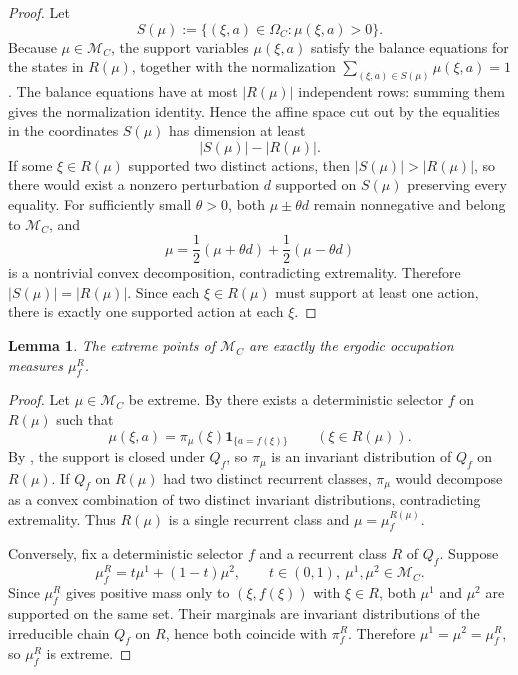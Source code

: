 \documentclass[12pt]{article}
\newtheorem{lemma}[theorem]{Lemma}
\theoremstyle{definition}
\newcommand{\1}{\mathbf{1}}
\newcommand{\cM}{\mathcal{M}}
\begin{document}
\begin{proof}
Let
\[
S(\mu):=\{(\xi,a)\in \Omega_C:\mu(\xi,a)>0\}.
\]
Because \(\mu\in \cM_C\), the support variables \(\mu(\xi,a)\) satisfy the balance
equations for the states in \(R(\mu)\), together with the normalization
\(\sum_{(\xi,a)\in S(\mu)}\mu(\xi,a)=1\).  The balance equations have at most \(|R(\mu)|\)
independent rows: summing them gives the normalization identity.  Hence the affine space
cut out by the equalities in the coordinates \(S(\mu)\) has dimension at least
\[
|S(\mu)|-|R(\mu)|.
\]
If some \(\xi\in R(\mu)\) supported two distinct actions, then \(|S(\mu)|>|R(\mu)|\), so
there would exist a nonzero perturbation \(d\) supported on \(S(\mu)\) preserving every
equality.  For sufficiently small \(\theta>0\), both \(\mu\pm \theta d\) remain
nonnegative and belong to \(\cM_C\), and
\[
\mu=\frac12(\mu+\theta d)+\frac12(\mu-\theta d)
\]
is a nontrivial convex decomposition, contradicting extremality.  Therefore
\(|S(\mu)|=|R(\mu)|\).  Since each \(\xi\in R(\mu)\) must support at least one action,
there is exactly one supported action at each \(\xi\).
\end{proof}

\begin{lemma}
\label{lem:extreme-ergodic2}
The extreme points of \(\cM_C\) are exactly the ergodic occupation measures \(\mu_f^R\).
\end{lemma}

\begin{proof}
Let \(\mu\in \cM_C\) be extreme.  By  there exists a
deterministic selector \(f\) on \(R(\mu)\) such that
\[
\mu(\xi,a)=\pi_\mu(\xi)\1_{\{a=f(\xi)\}}
\qquad (\xi\in R(\mu)).
\]
By , the support is closed under \(Q_f\), so \(\pi_\mu\) is an
invariant distribution of \(Q_f\) on \(R(\mu)\).  If \(Q_f\) on \(R(\mu)\) had two
distinct recurrent classes, \(\pi_\mu\) would decompose as a convex combination of two
distinct invariant distributions, contradicting extremality.  Thus \(R(\mu)\) is a single
recurrent class and \(\mu=\mu_f^{R(\mu)}\).

Conversely, fix a deterministic selector \(f\) and a recurrent class \(R\) of \(Q_f\).
Suppose
\[
\mu_f^R=t\mu^1+(1-t)\mu^2,\qquad t\in(0,1),\ \mu^1,\mu^2\in \cM_C.
\]
Since \(\mu_f^R\) gives positive mass only to \((\xi,f(\xi))\) with \(\xi\in R\), both
\(\mu^1\) and \(\mu^2\) are supported on the same set.  Their marginals are invariant
distributions of the irreducible chain \(Q_f\) on \(R\), hence both coincide with
\(\pi_f^R\).  Therefore \(\mu^1=\mu^2=\mu_f^R\), so \(\mu_f^R\) is extreme.
\end{proof}
\end{document}
